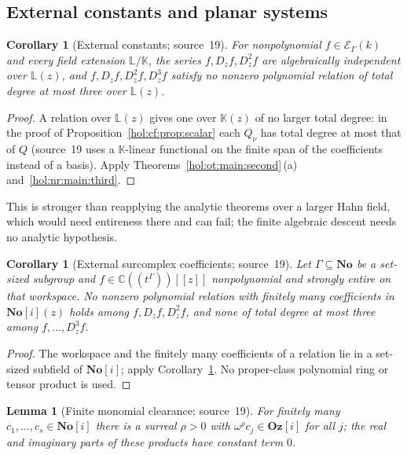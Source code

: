 \documentclass[11pt]{article}
\numberwithin{equation}{section}
\newtheorem{lemma}[theorem]{Lemma}
\newtheorem{corollary}[theorem]{Corollary}
\theoremstyle{definition}
\theoremstyle{remark}
\newcommand{\C}{\mathbb C}
\newcommand{\No}{\mathbf{No}}
\newcommand{\KK}{\mathbb K}
\newcommand{\EK}{\mathcal E_\Gamma(k)}
\newcommand{\Oz}{\mathbf{Oz}}
\begin{document}
\subsection{External constants and planar systems}
\label{hol:nr:sub:constants}

\begin{corollary}[External constants; source~19]\label{hol:nr:cor:external}
For nonpolynomial $f\in\EK$ and every field extension $\mathbb L/\KK$, the
series $f,D_zf,D_z^2f$ are algebraically independent over $\mathbb L(z)$, and
$f,D_zf,D_z^2f,D_z^3f$ satisfy no nonzero polynomial relation of total degree
at most three over $\mathbb L(z)$.
\end{corollary}

\begin{proof}
A relation over $\mathbb L(z)$ gives one over $\KK(z)$ of no larger total
degree: in the proof of Proposition~\ref{hol:cf:prop:scalar} each $Q_\nu$ has
total degree at most that of $Q$ (source~19 uses a $\KK$-linear functional on
the finite span of the coefficients instead of a basis). Apply
Theorems~\ref{hol:ot:main:second}\,(a) and~\ref{hol:nr:main:third}.
\end{proof}

This is stronger than reapplying the analytic theorems over a larger Hahn
field, which would need entireness there and can fail; the finite algebraic
descent needs no analytic hypothesis.

\begin{corollary}[External surcomplex coefficients; source~19]
\label{hol:nr:cor:surcomplex}
Let $\Gamma\subseteq\No$ be a set-sized subgroup and $f\in\C((t^\Gamma))[[z]]$
nonpolynomial and strongly entire on that workspace. No nonzero polynomial
relation with finitely many coefficients in $\No[i](z)$ holds among
$f,D_zf,D_z^2f$, and none of total degree at most three among
$f,\ldots,D_z^3f$.
\end{corollary}

\begin{proof}
The workspace and the finitely many coefficients of a relation lie in a
set-sized subfield of $\No[i]$; apply Corollary~\ref{hol:nr:cor:external}. No
proper-class polynomial ring or tensor product is used.
\end{proof}

\begin{lemma}[Finite monomial clearance; source~19]
\label{hol:nr:lem:omnificclear}
For finitely many $c_1,\ldots,c_s\in\No[i]$ there is a surreal $\rho>0$ with
$\omega^\rho c_j\in\Oz[i]$ for all $j$; the real and imaginary parts of these
products have constant term $0$.
\end{lemma}
\end{document}
